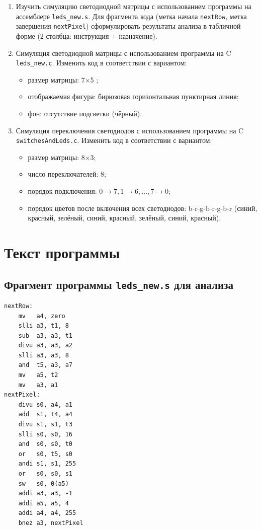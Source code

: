 \documentclass[12pt]{extarticle}
\renewcommand{\baselinestretch}{1.5}
\begin{document}
\begin{enumerate}
    \item Изучить симуляцию светодиодной матрицы с использованием программы на ассемблере \texttt{leds\_new.s}. Для фрагмента кода (метка начала \texttt{nextRow}, метка завершения \texttt{nextPixel}) сформулировать результаты анализа в табличной форме (2 столбца: инструкция + назначение).
    \item Симуляция светодиодной матрицы с использованием программы на C \texttt{leds\_new.c}. Изменить код в соответствии с вариантом:
    \begin{itemize}
        \item размер матрицы: 7×5 ;
        \item отображаемая фигура: бирюзовая горизонтальная пунктирная линия;
        \item фон: отсутствие подсветки (чёрный).
    \end{itemize}
    \item Симуляция переключения светодиодов с использованием программы на C \texttt{switchesAndLeds.c}. Изменить код в соответствии с вариантом:
    \begin{itemize}
        \item размер матрицы: 8×3;
        \item число переключателей: 8;
        \item порядок подключения: \(0\to7, 1\to6, \ldots, 7\to0\);
        \item порядок цветов после включения всех светодиодов: b-r-g-b-r-g-b-r (синий, красный, зелёный, синий, красный, зелёный, синий, красный).
    \end{itemize}
\end{enumerate}

\section{Текст программы}

\subsection{Фрагмент программы \texttt{leds\_new.s} для анализа}
\renewcommand{\baselinestretch}{1}
\begin{lstlisting}[language={[x86masm]Assembler},caption={Фрагмент \texttt{nextRow}--\texttt{nextPixel} из \texttt{leds\_new.s}}]
nextRow:
    mv   a4, zero
    slli a3, t1, 8
    sub  a3, a3, t1
    divu a3, a3, a2
    slli a3, a3, 8
    and  t5, a3, a7
    mv   a5, t2
    mv   a3, a1
nextPixel:
    divu s0, a4, a1
    add  s1, t4, a4
    divu s1, s1, t3
    slli s0, s0, 16
    and  s0, s0, t0
    or   s0, t5, s0
    andi s1, s1, 255
    or   s0, s0, s1
    sw   s0, 0(a5)
    addi a3, a3, -1
    addi a5, a5, 4
    addi a4, a4, 255
    bnez a3, nextPixel
\end{lstlisting}
\renewcommand{\baselinestretch}{1.5}
\end{document}
